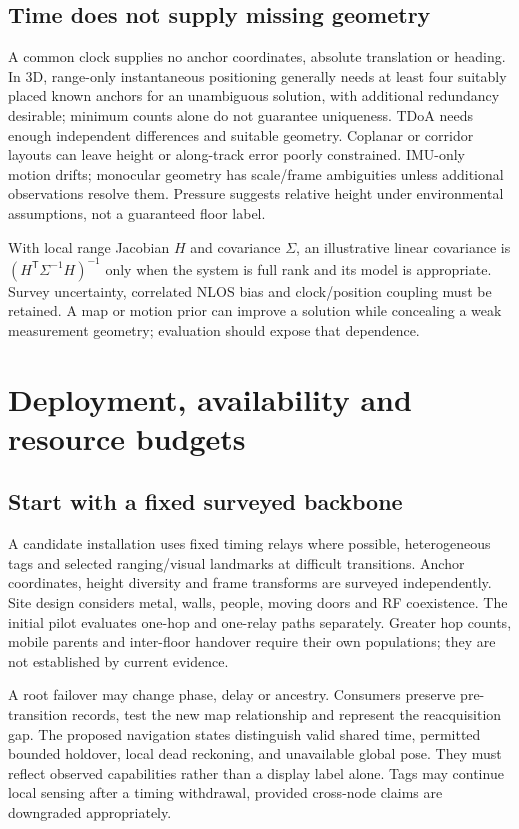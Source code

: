 \documentclass[11pt,letterpaper]{article}
\begin{document}
\subsection{Time does not supply missing geometry}
A common clock supplies no anchor coordinates, absolute translation or heading. In 3D, range-only instantaneous positioning generally needs at least four suitably placed known anchors for an unambiguous solution, with additional redundancy desirable; minimum counts alone do not guarantee uniqueness. TDoA needs enough independent differences and suitable geometry. Coplanar or corridor layouts can leave height or along-track error poorly constrained. IMU-only motion drifts; monocular geometry has scale/frame ambiguities unless additional observations resolve them. Pressure suggests relative height under environmental assumptions, not a guaranteed floor label.

With local range Jacobian $H$ and covariance $\Sigma$, an illustrative linear covariance is $(H^{\mathsf T}\Sigma^{-1}H)^{-1}$ only when the system is full rank and its model is appropriate. Survey uncertainty, correlated NLOS bias and clock/position coupling must be retained. A map or motion prior can improve a solution while concealing a weak measurement geometry; evaluation should expose that dependence.

\section{Deployment, availability and resource budgets}\label{sec:deployment}
\subsection{Start with a fixed surveyed backbone}
A candidate installation uses fixed timing relays where possible, heterogeneous tags and selected ranging/visual landmarks at difficult transitions. Anchor coordinates, height diversity and frame transforms are surveyed independently. Site design considers metal, walls, people, moving doors and RF coexistence. The initial pilot evaluates one-hop and one-relay paths separately. Greater hop counts, mobile parents and inter-floor handover require their own populations; they are not established by current evidence.

A root failover may change phase, delay or ancestry. Consumers preserve pre-transition records, test the new map relationship and represent the reacquisition gap. The proposed navigation states distinguish valid shared time, permitted bounded holdover, local dead reckoning, and unavailable global pose. They must reflect observed capabilities rather than a display label alone. Tags may continue local sensing after a timing withdrawal, provided cross-node claims are downgraded appropriately.
\end{document}
